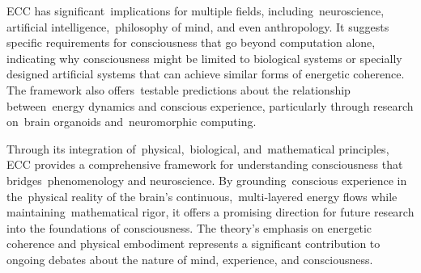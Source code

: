 ECC has significant~implications for multiple fields, including~neuroscience, artificial intelligence,~philosophy of mind, and even anthropology. It suggests specific requirements for consciousness that go beyond computation alone, indicating why consciousness might be limited to biological systems or specially designed artificial systems that can achieve similar forms of energetic coherence. The framework also offers~testable predictions about the relationship between~energy dynamics and conscious experience, particularly through research on~brain organoids and~neuromorphic computing.

Through its integration of~physical,~biological, and~mathematical principles, ECC provides a comprehensive framework for understanding consciousness that bridges~phenomenology and neuroscience. By grounding~conscious experience in the~physical reality of the brain's continuous,~multi-layered energy flows while maintaining~mathematical rigor, it offers a promising direction for future research into the foundations of consciousness. The theory's emphasis on energetic coherence and physical embodiment represents a significant contribution to ongoing debates about the nature of mind, experience, and consciousness.